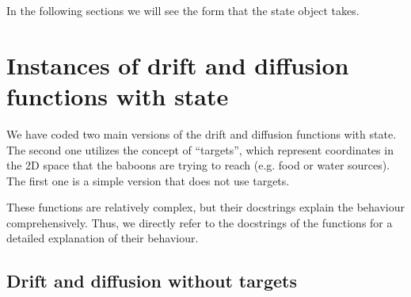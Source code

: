 \documentclass[
    article,
    oneside,
]{memoir}
\begin{document}
In the following sections we will see the form that the state object takes.

\chapter{Instances of drift and diffusion functions with state}

We have coded two main versions of the drift and diffusion functions with state. The second one utilizes the concept of ``targets'', which represent coordinates in the 2D space that the baboons are trying to reach (e.g. food or water sources). The first one is a simple version that does not use targets.

These functions are relatively complex, but their docstrings explain the behaviour comprehensively. Thus, we directly refer to the docstrings of the functions for a detailed explanation of their behaviour. 

\section{Drift and diffusion without targets}
\end{document}
